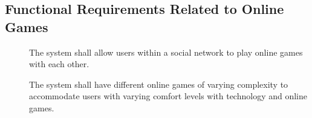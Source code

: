 \subsection*{Functional Requirements Related to Online Games}

\begin{description}
    \item[\textbf{\showfuncgamecounter}]
        The system shall allow users within a social network to play online
            games with each other.
    \item[\textbf{\showfuncgamecounter}]
        The system shall have different online games of varying complexity to
            accommodate users with varying comfort levels with technology and
            online games.
\end{description}
